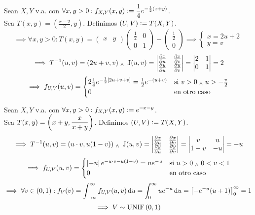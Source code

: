 
\begin{ejem}
	Sean $X, Y$ v.a. con $\displaystyle \forall x, y > 0 : f_{X, Y}(x, y) \vcentcolon= \frac{1}{4} e^{-\frac{1}{2}(x+y)}$.\\
	Sea $T(x, y) = \left(\frac{x-2}{2}, y\right)$. Definimos $(U, V) \vcentcolon= T(X, Y)$.
	\[\implies \forall x, y > 0 : T(x, y) = \begin{pmatrix} x & y\end{pmatrix}\begin{pmatrix}
			\frac{1}{2} & 0 \\
			0           & 1
		\end{pmatrix} - \begin{pmatrix} \frac{1}{2} \\ 0 \end{pmatrix} \implies \begin{cases}
			x = 2u + 2 \\
			y = v
		\end{cases}\]
	\[\implies T^{-1} (u, v) = (2u+v, v) \; _{\wedge} \; \operatorname{J}(u, v) = \begin{vmatrix}
			\pdv{x}{u} & \pdv{x}{v} \\
			\pdv{y}{u} & \pdv{y}{v}
		\end{vmatrix}=\begin{vmatrix}
			2 & 1 \\
			0 & 1
		\end{vmatrix} = 2\]
	\[\implies f_{U, V}(u, v) = \begin{cases}
			2\frac{1}{4}e^{-\frac{1}{2}[2u+v+v]} = \frac{1}{2} e^{-(u+v)} & \text{si } v > 0 \; _{\wedge} \; u > -\frac{v}{2} \\
			0                                                             & \text{en otro caso}
		\end{cases}\]
\end{ejem}

\begin{ejem}
	Sean $X, Y$ v.a. con $\displaystyle \forall x, y > 0 : f_{X, Y}(x, y) \vcentcolon= e^{-x-y}$.\\
	Sea $\displaystyle T(x, y) = \left(x+y, \frac{x}{x+y}\right)$. Definimos $(U, V) \vcentcolon= T(X, Y)$.
	\[\implies T^{-1}(u, v) = (u\cdot v, u(1-v)) \; _{\wedge} \; \operatorname{J}(u, v) = \begin{vmatrix}
			\pdv{x}{u} & \pdv{x}{v} \\
			\pdv{y}{u} & \pdv{y}{v}
		\end{vmatrix} = \begin{vmatrix}
			v   & u  \\
			1-v & -u
		\end{vmatrix} = -u\]
	\[\implies f_{U, V}(u, v) = \begin{cases}
			\left|-u\right| e^{-u\cdot v - u(1-v)} = u e^{-u} & \text{si } u > 0 \; _{\wedge} \; 0 < v < 1 \\
			0                                          & \text{en otro caso}
		\end{cases}\]
	\[\implies \forall v \in (0,1) : f_V(v) = \int_{-\infty}^{\infty} f_{U, V}(u, v) \odif{u} = \int_{0}^{\infty} u e^{-u} \odif{u} = \left[-e^{-u}(u+1)\right]_{0}^{\infty} = 1\]
	\[\implies V\sim\operatorname{UNIF}\left(0,1\right)\]
\end{ejem}

